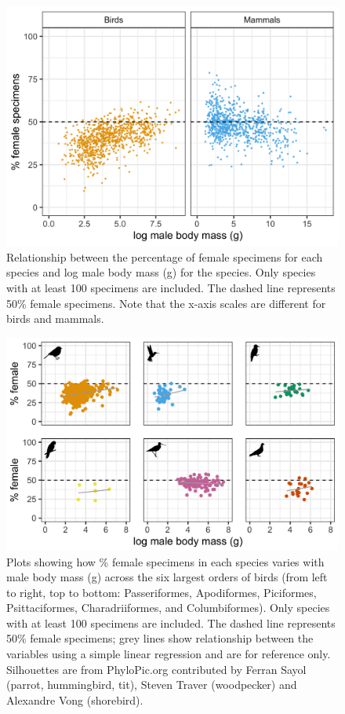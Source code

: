 \documentclass[a4paper, 12pt]{article}
\begin{document}
\begin{figure}[H]
 \centering
  \includegraphics[width = \linewidth]{figures/male-mass-all.png}
  \caption{Relationship between the percentage of female specimens for each species and log male body mass (g) for the species. 
  Only species with at least 100 specimens are included. 
  The dashed line represents 50\% female specimens. 
  Note that the x-axis scales are different for birds and mammals.
}
  \label{fig-male-mass}
\end{figure}

\begin{figure}[H]
 \centering
  \includegraphics[width = \linewidth]{figures/mass-orders-birds.png}
  \caption{Plots showing how \% female specimens in each species varies with male body mass (g) across the six largest orders of birds (from left to right, top to bottom: Passeriformes, Apodiformes, Piciformes, Psittaciformes, Charadriiformes, and Columbiformes). 
  Only species with at least 100 specimens are included. 
  The dashed line represents 50\% female specimens; grey lines show relationship between the variables using a simple linear regression and are for reference only. 
  Silhouettes are from PhyloPic.org contributed by Ferran Sayol (parrot, hummingbird, tit), Steven Traver (woodpecker) and Alexandre Vong (shorebird).}
  \label{fig-bird-male-mass}
\end{figure}
\end{document}
